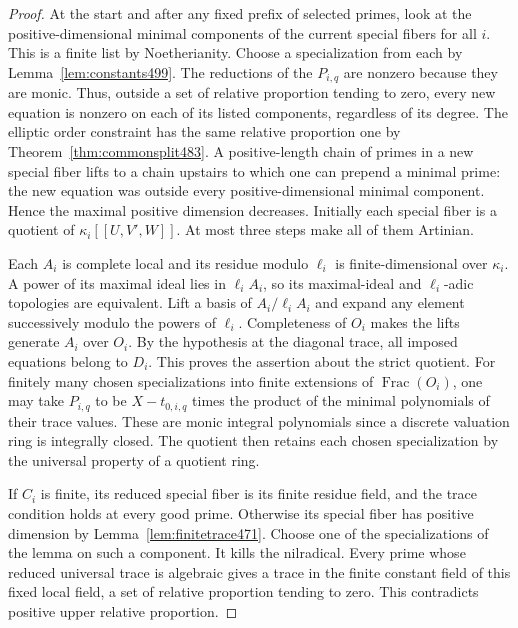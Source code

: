 \documentclass[a4paper,11pt]{article}
\theoremstyle{definition}
\theoremstyle{remark}
\numberwithin{equation}{section}
\begin{document}
\begin{proof}
At the start and after any fixed prefix of selected primes,
look at the positive-dimensional minimal components of the
current special fibers for all \(i\). This is a finite list
by Noetherianity. Choose a specialization from each by
Lemma~\ref{lem:constants499}. The reductions of the \(P_{i,q}\)
are nonzero because they are monic. Thus, outside a set of
relative proportion tending to zero, every new equation is
nonzero on each of its listed components, regardless of its
degree. The elliptic order constraint has the same relative
proportion one by Theorem~\ref{thm:commonsplit483}. A
positive-length chain of primes in a new special fiber lifts
to a chain upstairs to which one can prepend a minimal prime:
the new equation was outside every positive-dimensional minimal
component. Hence the maximal positive dimension decreases.
Initially each special fiber is a quotient of
\(\kappa_i[[U,V',W]]\). At most three steps make all of them
Artinian.

Each \(A_i\) is complete local and its residue modulo \(\ell_i\)
is finite-dimensional over \(\kappa_i\). A power of its maximal
ideal lies in \(\ell_i A_i\), so its maximal-ideal and
\(\ell_i\)-adic topologies are equivalent. Lift a basis of
\(A_i/\ell_i A_i\) and expand any element successively modulo
the powers of \(\ell_i\). Completeness of \(O_i\) makes the
lifts generate \(A_i\) over \(O_i\). By the hypothesis at the
diagonal trace, all imposed equations belong to \(D_i\). This
proves the assertion about the strict quotient. For finitely
many chosen specializations into finite extensions of
\(\operatorname{Frac}(O_i)\), one may take
\(P_{i,q}\) to be \(X-t_{0,i,q}\) times the product of the
minimal polynomials of their trace values. These are monic
integral polynomials since a discrete valuation ring is
integrally closed. The quotient then retains each chosen
specialization by the universal property of a quotient ring.

If \(C_i\) is finite, its reduced special fiber is its finite
residue field, and the trace condition holds at every good
prime. Otherwise its special fiber has positive dimension
by Lemma~\ref{lem:finitetrace471}. Choose one of the
specializations of the lemma on such a component. It kills
the nilradical. Every prime whose reduced universal trace
is algebraic gives a trace in the finite constant field of
this fixed local field, a set of relative proportion tending
to zero. This contradicts positive upper relative proportion.
\end{proof}
\end{document}
